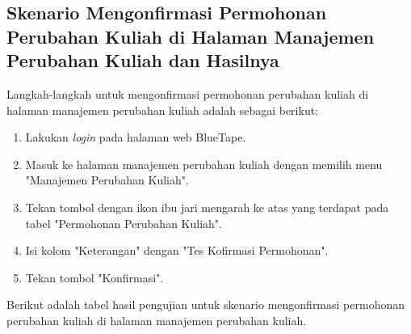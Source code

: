 \subsection{Skenario Mengonfirmasi Permohonan Perubahan Kuliah di Halaman Manajemen Perubahan Kuliah dan Hasilnya}
\label{subsec:skenario_mengonfirmasi_permohonan_perubahan_kuliah_di_halaman_manajemen_perubahan_kuliah}
Langkah-langkah untuk mengonfirmasi permohonan perubahan kuliah di halaman manajemen perubahan kuliah adalah sebagai berikut:

\begin{enumerate}
    \item Lakukan \textit{login} pada halaman web BlueTape.
    \item Masuk ke halaman manajemen perubahan kuliah dengan memilih menu "Manajemen Perubahan Kuliah".
    \item Tekan tombol dengan ikon ibu jari mengarah ke atas yang terdapat pada tabel "Permohonan Perubahan Kuliah".
    \item Isi kolom "Keterangan" dengan "Tes Kofirmasi Permohonan".
    \item Tekan tombol "Konfirmasi".
\end{enumerate}

Berikut adalah tabel hasil pengujian untuk skenario mengonfirmasi permohonan perubahan kuliah di halaman manajemen perubahan kuliah.

